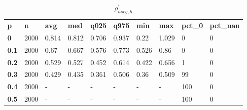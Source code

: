 \begin{table}[h]
 \centering 
\footnotesize
\caption{$\rho_{hscg,h}^\prime $}
\label{tab:alphahscgh}
\begin{tabular}[h]{| l l l l l l l l l l|
    } \hline
\textbf{ p} & \textbf{ n} & \textbf{ avg} & \textbf{ med} & \textbf{ q025} & \textbf{ q975} & \textbf{ min} & \textbf{ max} & \textbf{ pct\_0} & \textbf{ pct\_nan}
           \\
  \textbf{  0} & 2000 & 0.814 & 0.812 & 0.706 & 0.937 &  0.22 & 1.029 &   0 & 0
           \\
  \textbf{0.1} & 2000 &  0.67 & 0.667 & 0.576 & 0.773 & 0.526 &  0.86 &   0 & 0
           \\
  \textbf{0.2} & 2000 & 0.529 & 0.527 & 0.452 & 0.614 & 0.422 & 0.656 &   1 & 0
           \\
  \textbf{0.3} & 2000 & 0.429 & 0.435 & 0.361 & 0.506 &  0.36 & 0.509 &  99 & 0
           \\
  \textbf{0.4} & 2000 & - & - & - & - & - & - & 100 & 0
           \\
  \textbf{0.5} & 2000 & - & - & - & - & - & - & 100 & 0
           \\
 \hline \end{tabular}
 \end{table}
